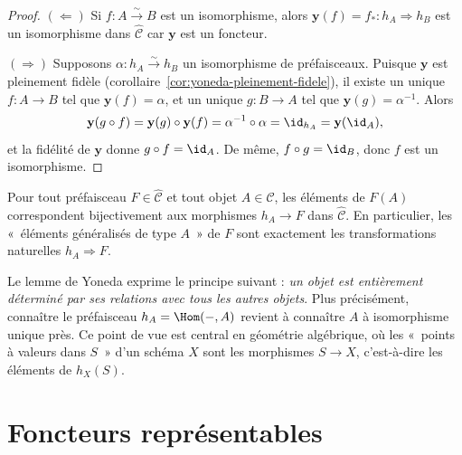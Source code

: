 \begin{proof}
$(\Leftarrow)$ Si $f \colon A \xrightarrow{\sim} B$ est un isomorphisme,
alors $\mathbf{y}(f) = f_* \colon h_A \Rightarrow h_B$ est un isomorphisme
dans $\widehat{\mathcal{C}}$ car $\mathbf{y}$ est un foncteur.

$(\Rightarrow)$ Supposons $\alpha \colon h_A \xrightarrow{\sim} h_B$
un isomorphisme de préfaisceaux.
Puisque $\mathbf{y}$ est pleinement fidèle
(corollaire~\ref{cor:yoneda-pleinement-fidele}), il existe un unique
$f \colon A \to B$ tel que $\mathbf{y}(f) = \alpha$,
et un unique $g \colon B \to A$ tel que $\mathbf{y}(g) = \alpha^{-1}$.
Alors
\[
    \mathbf{y}(g \circ f) = \mathbf{y}(g) \circ \mathbf{y}(f)
    = \alpha^{-1} \circ \alpha = \id_{h_A} = \mathbf{y}(\id_A),
\]
et la fidélité de $\mathbf{y}$ donne $g \circ f = \id_A$.
De même, $f \circ g = \id_B$, donc $f$ est un isomorphisme.
\end{proof}

\begin{corollaire}\label{cor:yoneda-elements}
Pour tout préfaisceau $F \in \widehat{\mathcal{C}}$ et tout objet
$A \in \mathcal{C}$, les éléments de $F(A)$ correspondent
bijectivement aux morphismes $h_A \to F$ dans $\widehat{\mathcal{C}}$.
En particulier, les «~éléments généralisés de type $A$~» de $F$
sont exactement les transformations naturelles $h_A \Rightarrow F$.
\end{corollaire}

\begin{remarque}\label{rem:yoneda-philosophie}
Le lemme de Yoneda exprime le principe suivant : \emph{un objet est
entièrement déterminé par ses relations avec tous les autres objets}.
Plus précisément, connaître le préfaisceau $h_A = \Hom(-, A)$ revient
à connaître $A$ à isomorphisme unique près. Ce point de vue
est central en géométrie algébrique, où les «~points à valeurs dans $S$~»
d'un schéma $X$ sont les morphismes $S \to X$, c'est-à-dire les éléments
de $h_X(S)$.
\end{remarque}


\section{Foncteurs représentables}\label{sec:foncteurs-representables}

